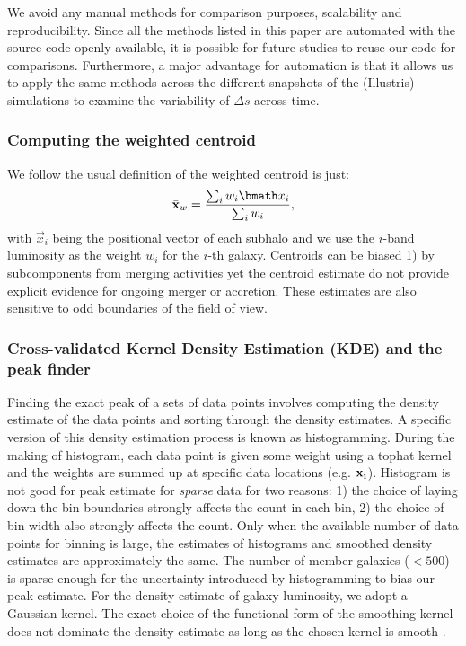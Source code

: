 We avoid any manual methods for
comparison purposes, scalability and reproducibility. 
Since all the methods listed in this
paper are automated with the source code openly available, 
it is possible for future studies to reuse our code for comparisons. 
Furthermore, a major advantage for automation is that it allows us  
to apply
the same methods across the different snapshots of the (Illustris) simulations to
examine the variability of $\Delta s$ across time. 


\subsubsection{Computing the weighted centroid}
\label{subsubsec:weighted_centroid}
We follow the usual definition of the weighted centroid is just: 
\begin{equation}
	\bar{\bf x}_w = \frac{\sum_i w_i \vec{x}_i}{\sum_i w_i},
\end{equation}
with $\vec{x}_i$ being the positional vector of each subhalo 
and we use the $i$-band luminosity 
as the weight $w_i$ for the $i$-th galaxy.
Centroids can be biased 1) by subcomponents from merging activities yet the
centroid estimate do not provide explicit evidence for ongoing merger or 
accretion. These estimates are also sensitive to odd boundaries 
of the field of view.

\subsubsection{Cross-validated Kernel Density Estimation (KDE) and the peak finder} 
\label{subsubsec:KDE}
Finding the exact peak of a sets of data points 
involves computing the density estimate of the data points and sorting through
the density estimates. A specific version of this density estimation process is
known as histogramming. During the making of histogram, each data point is
given some weight using a tophat kernel and the weights are summed up at
specific data locations (e.g. $\bf{x}_i$). 
Histogram is not good for peak estimate for {\it sparse} data for two reasons: 1) the
choice of laying down the bin boundaries strongly affects the count in each bin, 2) the choice of
bin width also strongly affects the count. Only when the available number of data points
for binning is large, the estimates of histograms and smoothed density
estimates are approximately the same. The number of member galaxies ($< 500$) 
is sparse enough for the uncertainty introduced by histogramming to bias our
peak estimate. For the density estimate of galaxy luminosity, 
we adopt a Gaussian kernel. 
The exact choice of the functional form of the smoothing kernel does
not dominate the density estimate as long as the chosen kernel is
smooth \citep{Feigelson2014}. 

